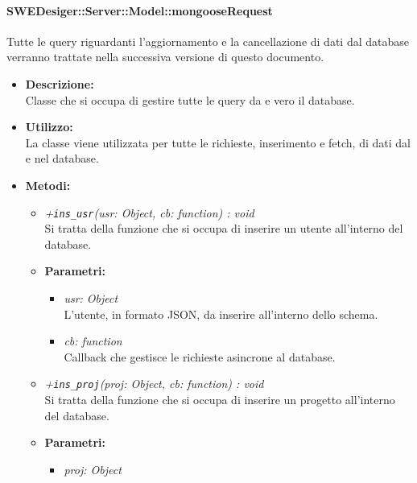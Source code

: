       \paragraph{SWEDesiger::Server::Model::mongooseRequest}
        Tutte le query riguardanti l'aggiornamento e la cancellazione di dati dal database verranno trattate nella successiva versione di questo documento.
        \begin{itemize}
          \item \textbf{Descrizione: }\\
          Classe che si occupa di gestire tutte le query da e vero il database.
          \item \textbf{Utilizzo: }\\
          La classe viene utilizzata per tutte le richieste, inserimento e fetch, di dati dal e nel database.
          \item \textbf{Metodi: }\\
          \begin{itemize}
            \item \emph{+\texttt{ins\_usr}(usr: Object, cb: function) : void}\\
            Si tratta della funzione che si occupa di inserire un utente all'interno del database.\\
            \item \textbf{Parametri: }\\
            \begin{itemize}
              \item \emph{usr: Object}\\
              L'utente, in formato JSON, da inserire all'interno dello schema.
              \item \emph{cb: function}\\
              Callback che gestisce le richieste asincrone al database.
            \end{itemize}
            \item \emph{+\texttt{ins\_proj}(proj: Object, cb: function) : void}\\
            Si tratta della funzione che si occupa di inserire un progetto all'interno del database.\\
            \item \textbf{Parametri: }\\
            \begin{itemize}
              \item \emph{proj: Object}\\

\end{itemize}
\end{itemize}
\end{itemize}
